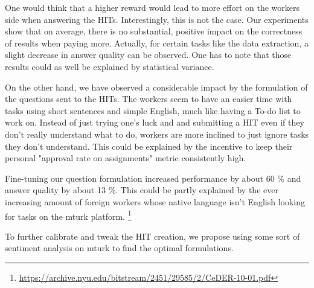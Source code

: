\documentclass{article}
\begin{document}
One would think that a higher reward would lead to more effort on the workers side when answering the HITs. Interestingly, this is not the case. Our experiments show that on average, there is no substantial, positive impact on the correctness of results when paying more. Actually, for certain tasks like the data extraction, a slight decrease in answer quality can be observed. One has to note that those results could as well be explained by statistical variance.

On the other hand, we have observed a considerable impact by the formulation of the questions sent to the HITs. The workers seem to have an easier time with tasks using short sentences and simple English, much like having a To-do list to work on. Instead of just trying one's luck and and submitting a HIT even if they don't really understand what to do, workers are more inclined to just ignore tasks they don't understand. This could be explained by the incentive to keep their personal "approval rate on assignments" metric consistently high. 

Fine-tuning our question formulation increased performance by about 60 \% and answer quality by about 13 \%. This could be partly explained by the ever increasing amount of foreign workers whose native language isn't English looking for tasks on the mturk platform. \footnote{\url{https://archive.nyu.edu/bitstream/2451/29585/2/CeDER-10-01.pdf}}

To further calibrate and tweak the HIT creation, we propose using some sort of sentiment analysis on mturk to find the optimal formulations.
\end{document}
